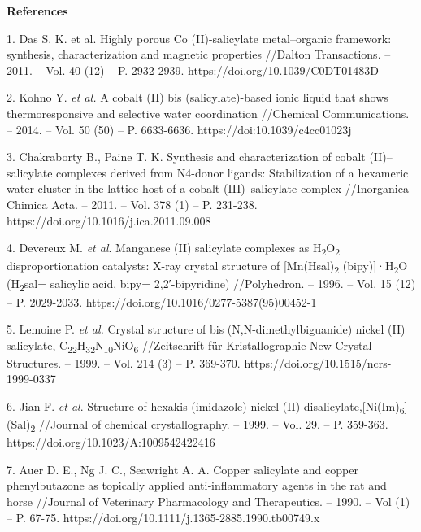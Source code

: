\begin{center}
{\bfseries References}
\end{center}

\begin{noparindent}
1.
  Das S. K. et al. Highly porous Co (II)-salicylate metal--organic
  framework: synthesis, characterization and magnetic properties
  //Dalton Transactions. -- 2011. -- Vol. 40 (12) -- P. 2932-2939.
  https://doi.org/10.1039/C0DT01483D

2.
  Kohno Y. \emph{et al.} A cobalt (II) bis (salicylate)-based ionic
  liquid that shows thermoresponsive and selective water coordination
  //Chemical Communications. -- 2014. -- Vol. 50 (50) -- P. 6633-6636.
  https://doi:10.1039/c4cc01023j

3.
  Chakraborty B., Paine T. K. Synthesis and characterization of cobalt
  (II)--salicylate complexes derived from N4-donor ligands:
  Stabilization of a hexameric water cluster in the lattice host of a
  cobalt (III)--salicylate complex //Inorganica Chimica Acta. -- 2011.
  -- Vol. 378 (1) -- P. 231-238.
  https://doi.org/10.1016/j.ica.2011.09.008

4.
  Devereux M. \emph{et al}. Manganese (II) salicylate complexes as
  H\textsubscript{2}O\textsubscript{2} disproportionation catalysts:
  X-ray crystal structure of {[}Mn(Hsal)\textsubscript{2}
  (bipy){]}·H\textsubscript{2}O (H\textsubscript{2}sal= salicylic acid,
  bipy= 2,2′-bipyridine) //Polyhedron. -- 1996. -- Vol. 15 (12) -- P.
  2029-2033. https://doi.org/10.1016/0277-5387(95)00452-1

5.
  Lemoine P. \emph{et al.} Crystal structure of bis
  (N,N-dimethylbiguanide) nickel (II) salicylate,
  C\textsubscript{22}H\textsubscript{32}N\textsubscript{10}NiO\textsubscript{6}
  //Zeitschrift für Kristallographie-New Crystal Structures. -- 1999. --
  Vol. 214 (3) -- P. 369-370. https://doi.org/10.1515/ncrs-1999-0337

6.
  Jian F. \emph{et al}. Structure of hexakis (imidazole) nickel (II)
  disalicylate,{[}Ni(Im)\textsubscript{6}{]}(Sal)\textsubscript{2}
  //Journal of chemical crystallography. -- 1999. -- Vol. 29. -- P.
  359-363. https://doi.org/10.1023/A:1009542422416

7.
  Auer D. E., Ng J. C., Seawright A. A. Copper salicylate and copper
  phenylbutazone as topically applied anti‐inflammatory agents in the
  rat and horse //Journal of Veterinary Pharmacology and Therapeutics.
  -- 1990. -- Vol (1) -- P. 67-75.
  https://doi.org/10.1111/j.1365-2885.1990.tb00749.x


\end{noparindent}
